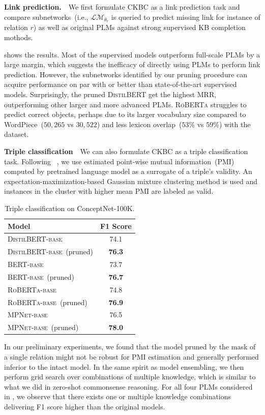\textbf{Link prediction.}~~We first formulate CKBC as a link prediction task 
and compare subnetworks~(i.e., $\mathcal{LM}_{\theta_r}$ 
is queried to predict missing link for instance of relation $r$) as well as original PLMs
against strong supervised KB completion mothods. 


 shows the results. Most of the supervised 
models outperform full-scale PLMs by a large margin, which suggests the 
inefficacy of directly using PLMs to perform link prediction. However, 
the subnetworks identified by our pruning procedure can
acquire performance on par with or better than state-of-the-art 
supervised models. Surprisingly, the pruned \textsc{DistilBERT} get the 
highest MRR, outperforming other larger and more advanced PLMs. 
\textsc{RoBERTa} struggles to predict correct objects, perhaps due to 
its larger vocabulary size compared to WordPiece~($50,265$ vs $30,522$) 
and less lexicon overlap~($53\%$ vs $59\%$) with the dataset.


\textbf{Triple classification}~~We can also formulate CKBC as a triple classification task. Following ~\citet{Feldman2020}, we use estimated point-wise mutual information~(PMI) computed by pretrained language model as a surrogate of a triple's validity. An expectation-maximization-based Gaussian mixture clustering method is used and instances in the cluster with higher mean PMI are labeled as valid. 
\begin{table}[th]
	\centering
	\scriptsize
	\begin{tabular}{l|c}
		\toprule
		\textbf{Model} &  \textbf{F1 Score}\\
		\midrule
		\textsc{DistilBERT-base} & 74.1\\
		\textsc{DistilBERT-base}~(pruned) & \textbf{76.3}\\
		\midrule
		\textsc{BERT-base} & 73.7\\
		\textsc{BERT-base}~(pruned) & \textbf{76.7}\\
		\midrule
		\textsc{RoBERTa-base} &74.8 \\
		\textsc{RoBERTa-base}~(pruned) & \textbf{76.9}\\
		\midrule
		\textsc{MPNet-base} &76.5 \\
		\textsc{MPNet-base}~(pruned) & \textbf{78.0}\\
		\bottomrule
	\end{tabular}
	\caption{Triple classification on ConceptNet-100K.}
	\label{table:tripleclassification}
\end{table}
In our preliminary experiments, we found that the model pruned by the mask 
of a single relation might not be robust for PMI estimation and generally 
performed inferior to the intact model. 
In the same spirit as model ensembling, we then perform grid search over 
combinations of multiple knowledge, which is similar to what we did 
in zero-shot commonsense reasoning. For all four PLMs considered in 
, we observe that there exists one 
or multiple knowledge combinations delivering F1 score higher than the 
original models.

